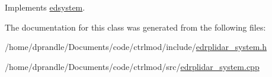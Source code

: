 Implements \hyperlink{classedsystem_afd5308dc71350fe4e239cac5fb1bdbe9}{edsystem}.



The documentation for this class was generated from the following files\-:\begin{DoxyCompactItemize}
\item 
/home/dprandle/\-Documents/code/ctrlmod/include/\hyperlink{edrplidar__system_8h}{edrplidar\-\_\-system.\-h}\item 
/home/dprandle/\-Documents/code/ctrlmod/src/\hyperlink{edrplidar__system_8cpp}{edrplidar\-\_\-system.\-cpp}\end{DoxyCompactItemize}
